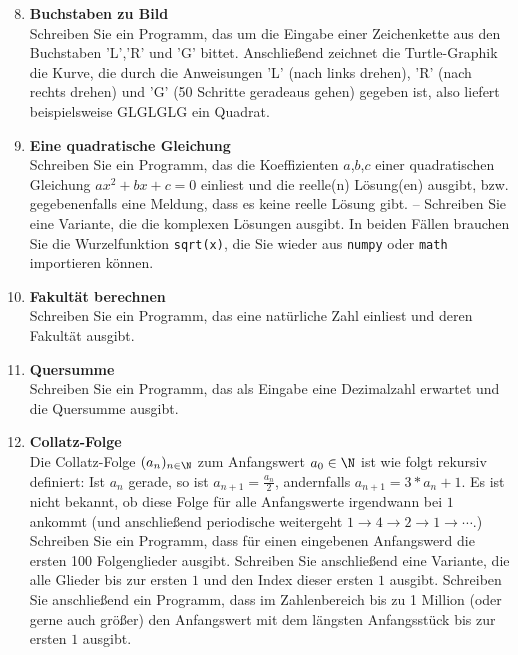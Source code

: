\begin{enumerate}[1.]

\setcounter{enumi}{7}


\item \textbf{Buchstaben zu Bild}\\
Schreiben Sie ein Programm, das um die Eingabe einer Zeichenkette
aus den Buchstaben 'L','R' und 'G' bittet. Anschließend zeichnet
die Turtle-Graphik die Kurve, die durch die Anweisungen 'L' (nach links
drehen), 'R' (nach rechts drehen) und 'G' (50 Schritte geradeaus gehen)
gegeben ist, also liefert beispielsweise GLGLGLG ein Quadrat.

\item \textbf{Eine quadratische Gleichung}\\ Schreiben Sie ein Programm, das die Koeffizienten $a$,$b$,$c$ einer
quadratischen Gleichung $ax^2+bx+c=0$ einliest und die reelle(n) Lösung(en) ausgibt,
bzw. gegebenenfalls eine Meldung, dass es keine reelle Lösung gibt.  
-- Schreiben Sie eine Variante, die die komplexen Lösungen ausgibt. In beiden
Fällen brauchen Sie die Wurzelfunktion \texttt{sqrt(x)}, die Sie wieder aus
\texttt{numpy} oder \texttt{math} importieren können. 
\item \textbf{Fakultät berechnen}\\ Schreiben Sie ein Programm, das eine natürliche Zahl einliest und
deren Fakultät ausgibt.
\item \textbf{Quersumme}\\
Schreiben Sie ein Programm, das als Eingabe eine Dezimalzahl erwartet
und die Quersumme ausgibt.
\item \textbf{Collatz-Folge}\\ Die Collatz-Folge $(a_n)_{n\in\N}$ zum Anfangswert $a_0\in \N$ ist wie folgt rekursiv definiert: Ist $a_n$ gerade, so ist $a_{n+1}=\frac{a_n}{2}$, andernfalls $a_{n+1}=3*a_n+1$.  Es ist nicht bekannt, ob diese Folge für alle Anfangswerte irgendwann bei $1$ ankommt (und anschließend periodische weitergeht $1\rightarrow 4 \rightarrow 2 \rightarrow 1 \rightarrow \cdots$.)
Schreiben Sie ein Programm, dass für einen eingebenen Anfangswerd die ersten 100
Folgenglieder ausgibt. Schreiben Sie anschließend eine Variante, die alle Glieder bis zur ersten $1$ und den Index dieser ersten $1$ ausgibt.  Schreiben Sie 
anschließend ein Programm, dass im Zahlenbereich bis zu 1 Million (oder gerne auch größer) den Anfangswert mit dem längsten Anfangsstück bis zur ersten $1$ ausgibt. 



\end{enumerate}
